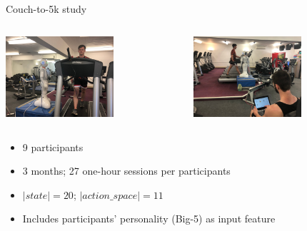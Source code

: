 \documentclass[xcolor=table,aspectratio=169]{beamer}
\begin{document}
{

\begin{frame}{Couch-to-5k study}

    \vspace{0.2cm}

    \begin{columns}
        \begin{column}{0.5\linewidth}
                \centering
                \includegraphics[height=3cm]{couch25k/hri.jpg}
        \end{column}
        \begin{column}{0.5\linewidth}
                \centering
                \includegraphics[height=3cm]{couch25k/supervised.jpg}
        \end{column}
    \end{columns}

    \begin{itemize}
        \item 9 participants
        \item 3 months; 27 one-hour sessions per participants
        \item $|state| = 20$; $|action\_space| = 11$
        \item Includes participants' personality (Big-5) as input feature
    \end{itemize}

\end{frame}
}
\end{document}
